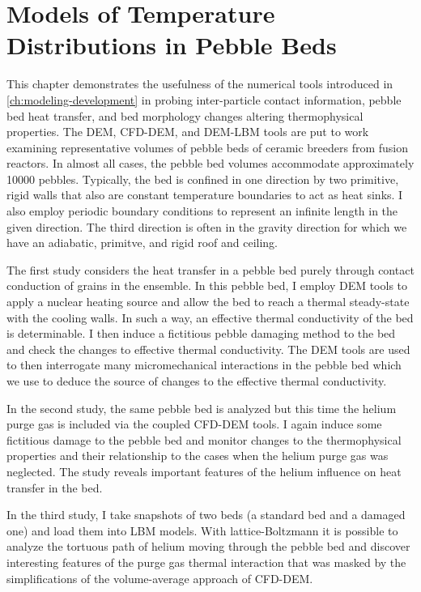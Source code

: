 \chapter{Models of Temperature Distributions in Pebble Beds}\label{sec:dem-studies}

This chapter demonstrates the usefulness of the numerical tools introduced in \cref{ch:modeling-development} in probing inter-particle contact information, pebble bed heat transfer, and bed morphology changes altering thermophysical properties. The DEM, CFD-DEM, and DEM-LBM tools are put to work examining representative volumes of pebble beds of ceramic breeders from fusion reactors. In almost all cases, the pebble bed volumes accommodate approximately \num{10000} pebbles. Typically, the bed is confined in one direction by two primitive, rigid walls that also are constant temperature boundaries to act as heat sinks. I also employ periodic boundary conditions to represent an infinite length in the given direction. The third direction is often in the gravity direction for which we have an adiabatic, primitve, and rigid roof and ceiling.

The first study considers the heat transfer in a pebble bed purely through contact conduction of grains in the ensemble. In this pebble bed, I employ DEM tools to apply a nuclear heating source and allow the bed to reach a thermal steady-state with the cooling walls. In such a way, an effective thermal conductivity of the bed is determinable. I then induce a fictitious pebble damaging method to the bed and check the changes to effective thermal conductivity. The DEM tools are used to then interrogate many micromechanical interactions in the pebble bed which we use to deduce the source of changes to the effective thermal conductivity.

In the second study, the same pebble bed is analyzed but this time the helium purge gas is included via the coupled CFD-DEM tools. I again induce some fictitious damage to the pebble bed and monitor changes to the thermophysical properties and their relationship to the cases when the helium purge gas was neglected. The study reveals important features of the helium influence on heat transfer in the bed.

In the third study, I take snapshots of two beds (a standard bed and a damaged one) and load them into LBM models. With lattice-Boltzmann it is possible to analyze the tortuous path of helium moving through the pebble bed and discover interesting features of the purge gas thermal interaction that was masked by the simplifications of the volume-average approach of CFD-DEM.



